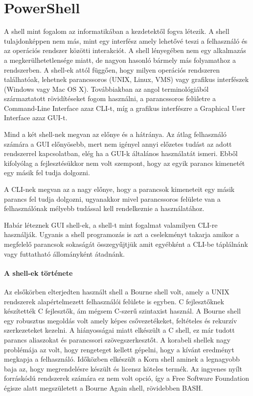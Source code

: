 \documentclass[12pt,oneside,justify,table]{book}
\begin{document}
\chapter{PowerShell}
A shell mint fogalom az informatikában a kezdetektől fogva létezik. A shell tulajdonképpen nem más, mint egy interfész amely lehetővé teszi a felhasználó és az operációs rendszer közötti interakciót. A shell lényegében nem egy alkalmazás a megkerülhetetlensége miatt, de nagyon hasonló bármely más folyamathoz a rendszerben. A shell-ek attól függően, hogy milyen operációs rendszeren találhatóak, lehetnek parancssoros (UNIX, Linux, VMS) vagy grafikus interfészek (Windows vagy Mac OS X). Továbbiakban az angol terminológiából származtatott rövidítéseket fogom használni, a parancssoros felületre a Command-Line Interface azaz CLI-t, míg a grafikus interfészre a Graphical User Interface azaz GUI-t.

Mind a két shell-nek megvan az előnye és a hátránya. Az átlag felhasználó számára a GUI előnyösebb, mert nem igényel annyi előzetes tudást az adott rendszerrel kapcsolatban, elég ha a GUI-k általános használatát ismeri. Ebből kifolyólag a fejlesztésükkor nem volt szempont, hogy az egyik parancs kimenetét egy másik fel tudja dolgozni. 

A CLI-nek megvan az a nagy előnye, hogy a parancsok kimeneteit egy másik parancs fel tudja dolgozni, ugyanakkor mivel parancssoros felülete van a felhasználónak mélyebb tudással kell rendelkeznie a használatához.

Habár léteznek GUI shell-ek, a shell-t mint fogalmat valamilyen CLI-re használják. Ugyanis a shell programozás is azt a cselekményt takarja amikor a megfelelő parancsok sokaságát összegyűjtjük amit egyébként a CLI-be táplálnánk vagy futtatható állományként átadnánk.
\cite{WindowsPowerShellUnleashed}

\subsubsection{A shell-ek története}
Az elsőkörben elterjedten használt shell a Bourne shell volt, amely a UNIX rendszerek alapértelmezett felhasználói felülete is egyben. C fejlesztőknek készítették C fejlesztők, ám mégsem C-szerű szintaxist használ. A Bourne shell egy robusztus megoldás volt amely képes csővezetékeket, feltételes és rekurzív szerkezeteket kezelni. A hiányosságai miatt elkészült a C shell, ez már tudott parancs aliaszokat és parancssori szövegszerkesztőt. A korabeli shellek nagy problémája az volt, hogy rengeteget kellett gépelni, hogy a kívánt eredményt megkapja a felhasználó. 
Időközben elkészült a Korn shell aminek a legnagyobb baja az, hogy megrendelésre készült és licensz köteles termék. Az ingyenes nyílt forráskódú rendszerek számára ez nem volt opció, így a Free Software Foundation égisze alatt megszületett a Bourne Again shell, rövidebben BASH.
\end{document}

